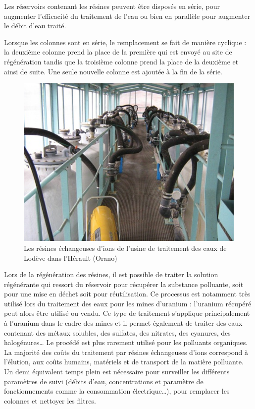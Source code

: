 \documentclass{article}
\begin{document}
Les réservoirs contenant les résines peuvent être disposés en série, pour augmenter l’efficacité du traitement de l’eau ou bien en parallèle pour augmenter le débit d’eau traité.

Lorsque les colonnes sont en série, le remplacement se fait de manière cyclique : la deuxième colonne prend la place de la première qui est envoyé au site de régénération tandis que la troisième colonne prend la place de la deuxième et ainsi de suite. Une seule nouvelle colonne est ajoutée à la fin de la série. %

\begin{figure}[H]
\centering
\includegraphics[width=0.9\linewidth]{III_A_3.png}
\caption{Les résines échangeuses d'ions de l'usine de traitement des eaux de Lodève dans l'Hérault (Orano)}
\label{fig:usine_traitement_resines}
\end{figure}

Lors de la régénération des résines, il est possible de traiter la solution régénérante qui ressort du réservoir pour récupérer la substance polluante, soit pour une mise en déchet soit pour réutilisation. Ce processus est notamment très utilisé lors du traitement des eaux pour les mines d’uranium : l’uranium récupéré peut alors être utilisé ou vendu.
Ce type de traitement s’applique principalement à l’uranium dans le cadre des mines et il permet également de traiter des eaux contenant des métaux solubles, des sulfates, des nitrates, des cyanures, des halogénures… Le procédé est plus rarement utilisé pour les polluants organiques.
La majorité des coûts du traitement par résines échangeuses d’ions correspond à l’élution, aux coûts humains, matériels et de transport de la matière polluante.
Un demi équivalent temps plein est nécessaire pour surveiller les différents paramètres de suivi (débits d’eau, concentrations et paramètre de fonctionnements comme la consommation électrique…), pour remplacer les colonnes et nettoyer les filtres.
\end{document}
